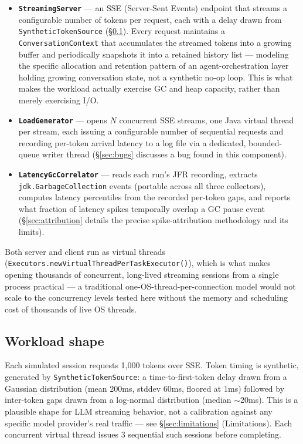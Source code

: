 \documentclass[11pt]{article}
\newcommand{\code}[1]{\texttt{#1}}
\begin{document}
\begin{itemize}[leftmargin=1.5em]
  \item \textbf{\code{StreamingServer}} --- an SSE (Server-Sent Events) endpoint that streams a
    configurable number of tokens per request, each with a delay drawn from
    \code{SyntheticTokenSource} (\S\ref{sec:workload}). Every request maintains a
    \code{ConversationContext} that accumulates the streamed tokens into a growing buffer and
    periodically snapshots it into a retained history list --- modeling the specific allocation
    and retention pattern of an agent-orchestration layer holding growing conversation state, not
    a synthetic no-op loop. This is what makes the workload actually exercise GC and heap
    capacity, rather than merely exercising I/O.
  \item \textbf{\code{LoadGenerator}} --- opens $N$ concurrent SSE streams, one Java virtual
    thread per stream, each issuing a configurable number of sequential requests and recording
    per-token arrival latency to a log file via a dedicated, bounded-queue writer thread
    (\S\ref{sec:bugs} discusses a bug found in this component).
  \item \textbf{\code{LatencyGcCorrelator}} --- reads each run's JFR recording, extracts
    \code{jdk.GarbageCollection} events (portable across all three collectors), computes latency
    percentiles from the recorded per-token gaps, and reports what fraction of latency spikes
    temporally overlap a GC pause event (\S\ref{sec:attribution} details the precise
    spike-attribution methodology and its limits).
\end{itemize}

Both server and client run as virtual threads (\code{Executors.newVirtualThreadPerTaskExecutor()}),
which is what makes opening thousands of concurrent, long-lived streaming sessions from a single
process practical --- a traditional one-OS-thread-per-connection model would not scale to the
concurrency levels tested here without the memory and scheduling cost of thousands of live OS
threads.

\subsection{Workload shape}
\label{sec:workload}

Each simulated session requests 1{,}000 tokens over SSE. Token timing is synthetic, generated by
\code{SyntheticTokenSource}: a time-to-first-token delay drawn from a Gaussian distribution
(mean 200ms, stddev 60ms, floored at 1ms) followed by inter-token gaps drawn from a log-normal
distribution (median $\sim$20ms). This is a plausible shape for LLM streaming behavior, not a
calibration against any specific model provider's real traffic --- see \S\ref{sec:limitations}
(Limitations). Each concurrent virtual thread issues 3 sequential such sessions before completing.
\end{document}
